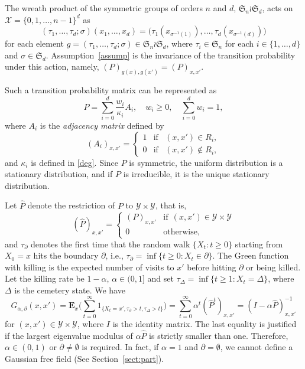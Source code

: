 \documentclass[a4paper,11pt]{article}
\theoremstyle{plain}
\theoremstyle{definition}
\begin{document}
The wreath product of the symmetric groups of orders
$n$ and $d$, $\mathfrak{S}_n\wr\mathfrak{S}_d$, acts
on $\mathcal{X}=\{0,1,\ldots,n-1\}^d$ as
\begin{equation}\label{wreath}
  (\tau_1,\ldots,\tau_d;\sigma)(x_1,\ldots,x_d)
  =\big(\tau_1(x_{\sigma^{-1}(1)}),\ldots,\tau_d(x_{\sigma^{-1}(d)})\big)
\end{equation}
for each element
$g=(\tau_1,\ldots,\tau_d;\sigma)\in\mathfrak{S}_n\wr\mathfrak{S}_d$,
where $\tau_i\in\mathfrak{S}_n$ for each $i\in\{1,\ldots,d\}$
and $\sigma\in\mathfrak{S}_d$. Assumption~\ref{assump} is
the invariance of the transition probability under this
action, namely, $(P)_{g(x),g(x')}=(P)_{x,x'}$.

Such a transition probability matrix can be
represented as
\begin{equation}\label{trans}
  P=\sum_{i=0}^d\frac{w_i}{\kappa_i}A_i, \quad 
  w_i\ge 0, \quad \sum_{i=0}^d w_i=1,
\end{equation}
where $A_i$ is the {\it adjacency matrix} defined
by
\[
  (A_i)_{x,x'}=\left\{
    \begin{array}{ccc}
      1 & \text{if} & (x,x')\in R_i,\\ 
      0 & \text{if} & (x,x')\notin R_i,
    \end{array}\right.
\]
and $\kappa_i$ is defined in \eqref{deg}.
Since $P$ is symmetric, the uniform distribution is
a stationary distribution, and if $P$ is irreducible,
it is the unique stationary distribution.

Let $\hat{P}$ denote the restriction of $P$ to
$\mathcal{Y}\times\mathcal{Y}$, that is,
\[
    (\hat{P})_{x,x'}=\left\{
    \begin{array}{ll}     
       (P)_{x,x'} & \text{if} ~~ (x,x')
       \in\mathcal{Y}\times\mathcal{Y}\\
       0        & \text{otherwise},
    \end{array}
    \right.
\]
and $\tau_\partial$ denotes the first time that
the random walk $\{X_t:t\ge 0\}$ starting from
$X_0=x$ hits the boundary $\partial$, i.e.,
$\tau_\partial=\inf\{t\ge 0:X_t\in\partial\}$.
The Green function with killing is the expected
number of visits to $x'$ before hitting $\partial$
or being killed. Let the killing rate be $1-\alpha$,
$\alpha\in(0,1]$ and set 
$\tau_\Delta=\inf\{t\ge 1:X_t=\Delta\}$, where
$\Delta$ is the cemetery state. We have
\begin{equation}
  G_{\alpha,\partial}(x,x')
  =\mathbf{E}_x\Big(\sum_{t=0}^\infty
  1_{\{X_t=x', \tau_\partial>t, \tau_\Delta>t\}}\Big)
  =\sum_{t=0}^\infty \alpha^t(\hat{P}^t)_{x,x'}
  =(I-\alpha\hat{P})^{-1}_{x,x'} \label{green}
\end{equation}
for $(x,x')\in \mathcal{Y}\times\mathcal{Y}$, where
$I$ is the identity matrix. The last equality is
justified if the largest eigenvalue modulus of
$\alpha\hat{P}$ is strictly smaller than one.
Therefore, $\alpha\in(0,1)$ or $\partial\neq\emptyset$
is required. In fact, if $\alpha=1$ and 
$\partial=\emptyset$, we cannot define a Gaussian
free field (See Section~\ref{sect:part}).
\end{document}
